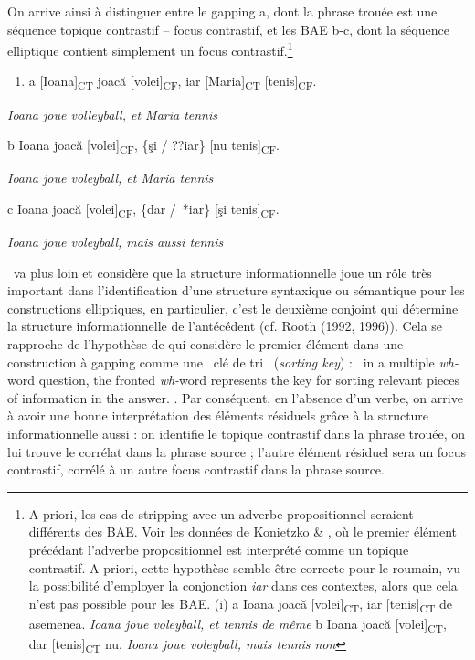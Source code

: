 On arrive ainsi à distinguer entre le gapping a, dont la phrase trouée est une séquence topique contrastif -- focus contrastif, et les BAE b-c, dont la séquence elliptique contient simplement un focus contrastif.\footnote{A priori, les cas de stripping avec un adverbe propositionnel seraient différents des BAE. Voir les données de Konietzko \& \citet{Winkler2010}, où le premier élément précédant l'adverbe propositionnel est interprété comme un topique contrastif. A priori, cette hypothèse semble être correcte pour le roumain, vu la possibilité d'employer la conjonction \textit{iar} dans ces contextes, alors que cela n'est pas possible pour les BAE. 
(i)  a  Ioana joacă [volei]\textsubscript{CT}, iar [tenis]\textsubscript{CT} de asemenea. 
    \textit{Ioana joue voleyball, et tennis de même}
  b  Ioana joacă [volei]\textsubscript{CT}, dar [tenis]\textsubscript{CT} nu.
    \textit{Ioana joue voleyball, mais tennis non}}  


\begin{enumerate}
\item \label{bkm:Ref289688955}a  [Ioana]\textsubscript{CT} joacă [volei]\textsubscript{CF}, iar [Maria]\textsubscript{CT} [tenis]\textsubscript{CF}.


\end{enumerate}
    \textit{Ioana joue volleyball, et Maria tennis}

  b  Ioana joacă [volei]\textsubscript{CF}, \{şi / ??iar\} [nu tenis]\textsubscript{CF}. 

{\itshape
Ioana joue voleyball, et Maria tennis } 

  c  Ioana joacă [volei]\textsubscript{CF}, \{dar /~*iar\} [şi tenis]\textsubscript{CF}. 

{\itshape
Ioana joue voleyball, mais aussi tennis}

\citet{Schwabe2000}~va plus loin et considère que la structure informationnelle joue un rôle très important dans l'identification d'une structure syntaxique ou sémantique pour les constructions elliptiques, en particulier, c'est le deuxième conjoint qui détermine la structure informationnelle de l'antécédent (cf. Rooth (1992, 1996)). Cela se rapproche de l'hypothèse de \citet{Kuno1982} qui considère le premier élément dans une construction à gapping comme une {\guillemotleft}~clé de tri~{\guillemotright} (\textit{sorting key}) : {\guillemotleft}~in a multiple \textit{wh-}word question, the fronted \textit{wh-}word represents the key for sorting relevant pieces of information in the answer. {\guillemotright}  \citet[141]{Kuno1982}. Par conséquent, en l'absence d'un verbe, on arrive à avoir une bonne interprétation des éléments résiduels grâce à la structure informationnelle aussi : on identifie le topique contrastif dans la phrase trouée, on lui trouve le corrélat dans la phrase source ; l'autre élément résiduel sera un focus contrastif, corrélé à un autre focus contrastif dans la phrase source. 

